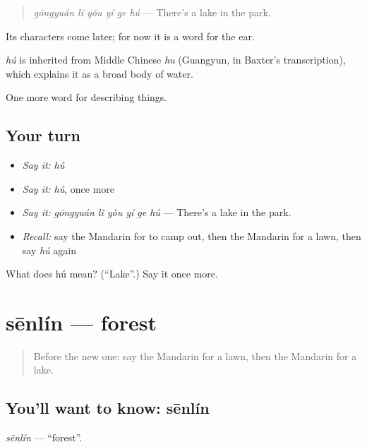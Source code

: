 \begin{quote}
\emph{gōngyuán lǐ yǒu yí ge hú} — There's a lake in the park.
\end{quote}

Its characters come later; for now it is a word for the ear.

\begin{cousinweb}
\emph{hú} is inherited from Middle Chinese \emph{hu} (Guangyun, in Baxter's transcription), which explains it as a broad body of water.
\end{cousinweb}

\begin{grammarlens}[title={What you've built}]
One more word for describing things.
\end{grammarlens}

\subsection*{Your turn}
\begin{itemize}
\raggedright
  \item \emph{Say it:} \emph{hú}
  \item \emph{Say it:} \emph{hú}, once more
  \item \emph{Say it:} \emph{gōngyuán lǐ yǒu yí ge hú} — There's a lake in the park.
  \item \emph{Recall:} say the Mandarin for to camp out, then the Mandarin for a lawn, then say \emph{hú} again
\end{itemize}

\begin{tcolorbox}[breakable,colback=teal!4,colframe=teal!35!black,title={Before you move on}]
What does hú mean? (\textquotedblleft{}Lake\textquotedblright{}.) Say it once more.
\end{tcolorbox}
\section[sēnlín]{sēnlín — forest}

\label{lesson:ZH-C226-senlin}



\begin{quote}
Before the new one: say the Mandarin for a lawn, then the Mandarin for a lake.
\end{quote}

\subsection*{You'll want to know: sēnlín}
\emph{sēnlín} — \textquotedblleft{}forest\textquotedblright{}.

